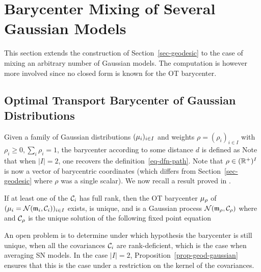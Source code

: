 \section{Barycenter Mixing of Several Gaussian Models}
\label{sec-barycenter}


This section extends the construction of Section~\ref{sec-geodesic} to the case of mixing an arbitrary number of Gaussian models. The computation is however more involved since no closed form is known for the OT barycenter.

\subsection{Optimal Transport Barycenter of Gaussian Distributions}

Given a family of Gaussian distributions $( \mu_i )_{i \in I}$ and weights $\rho = (\rho_i)_{i \in I}$ with $\rho_i \geq 0, \sum_i \rho_i=1$, the barycenter according to some distance $d$ is defined as
Note that when $|I|=2$, one recovers the definition~\eqref{eq-dfn-path}. Note that $\rho \in (\mathbb{R}^+)^{I}$ is now a vector of barycentric coordinates (which differs from Section~\ref{sec-geodesic} where $\rho$ was a single scalar). We now recall a result proved in \cite{Carlier_wasserstein_barycenter}.

\begin{proposition}\label{prop-bary-gaussian}
	If at least one of the $\mathcal{C}_{i}$ has full rank, then the OT barycenter $\mu_\rho$ of  $(\mu_i = \mathcal{N}({\frak m}_i,\mathcal{C}_i))_{i \in I}$ exists, is unique, and is a Gaussian process $\mathcal{N}({\frak m}_\rho,\mathcal{C}_\rho)$ where
	and $\mathcal{C}_\rho$ is the unique solution of the following fixed point equation
\end{proposition}

An open problem is to determine under which hypothesis the barycenter is still unique, when all the covariances $\mathcal{C}_i$ are rank-deficient, which is the case when averaging SN models. In the case $|I|=2$, Proposition~\ref{prop-geod-gaussian} ensures that this is the case under a restriction on the kernel of the covariances. 

